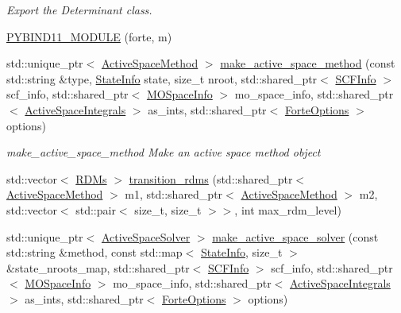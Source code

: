 \begin{DoxyCompactItemize}
\begin{DoxyCompactList}\small\item\em Export the Determinant class. \end{DoxyCompactList}\item 
\mbox{\hyperlink{namespaceforte_ae3f86c3917f37a8efe973b9ecc7edd67}{P\+Y\+B\+I\+N\+D11\+\_\+\+M\+O\+D\+U\+LE}} (forte, m)
\item 
std\+::unique\+\_\+ptr$<$ \mbox{\hyperlink{classforte_1_1_active_space_method}{Active\+Space\+Method}} $>$ \mbox{\hyperlink{namespaceforte_a7238bba7df981303b148d8cb693547f8}{make\+\_\+active\+\_\+space\+\_\+method}} (const std\+::string \&type, \mbox{\hyperlink{classforte_1_1_state_info}{State\+Info}} state, size\+\_\+t nroot, std\+::shared\+\_\+ptr$<$ \mbox{\hyperlink{classforte_1_1_s_c_f_info}{S\+C\+F\+Info}} $>$ scf\+\_\+info, std\+::shared\+\_\+ptr$<$ \mbox{\hyperlink{classforte_1_1_m_o_space_info}{M\+O\+Space\+Info}} $>$ mo\+\_\+space\+\_\+info, std\+::shared\+\_\+ptr$<$ \mbox{\hyperlink{classforte_1_1_active_space_integrals}{Active\+Space\+Integrals}} $>$ as\+\_\+ints, std\+::shared\+\_\+ptr$<$ \mbox{\hyperlink{classforte_1_1_forte_options}{Forte\+Options}} $>$ options)
\begin{DoxyCompactList}\small\item\em make\+\_\+active\+\_\+space\+\_\+method Make an active space method object \end{DoxyCompactList}\item 
std\+::vector$<$ \mbox{\hyperlink{classforte_1_1_r_d_ms}{R\+D\+Ms}} $>$ \mbox{\hyperlink{namespaceforte_af6e74dbb13765642ce142840ee088140}{transition\+\_\+rdms}} (std\+::shared\+\_\+ptr$<$ \mbox{\hyperlink{classforte_1_1_active_space_method}{Active\+Space\+Method}} $>$ m1, std\+::shared\+\_\+ptr$<$ \mbox{\hyperlink{classforte_1_1_active_space_method}{Active\+Space\+Method}} $>$ m2, std\+::vector$<$ std\+::pair$<$ size\+\_\+t, size\+\_\+t $>$$>$, int max\+\_\+rdm\+\_\+level)
\item 
std\+::unique\+\_\+ptr$<$ \mbox{\hyperlink{classforte_1_1_active_space_solver}{Active\+Space\+Solver}} $>$ \mbox{\hyperlink{namespaceforte_ab5b7864e2cd53284dc4743a626f1f060}{make\+\_\+active\+\_\+space\+\_\+solver}} (const std\+::string \&method, const std\+::map$<$ \mbox{\hyperlink{classforte_1_1_state_info}{State\+Info}}, size\+\_\+t $>$ \&state\+\_\+nroots\+\_\+map, std\+::shared\+\_\+ptr$<$ \mbox{\hyperlink{classforte_1_1_s_c_f_info}{S\+C\+F\+Info}} $>$ scf\+\_\+info, std\+::shared\+\_\+ptr$<$ \mbox{\hyperlink{classforte_1_1_m_o_space_info}{M\+O\+Space\+Info}} $>$ mo\+\_\+space\+\_\+info, std\+::shared\+\_\+ptr$<$ \mbox{\hyperlink{classforte_1_1_active_space_integrals}{Active\+Space\+Integrals}} $>$ as\+\_\+ints, std\+::shared\+\_\+ptr$<$ \mbox{\hyperlink{classforte_1_1_forte_options}{Forte\+Options}} $>$ options)
$$
\end{DoxyCompactItemize}
